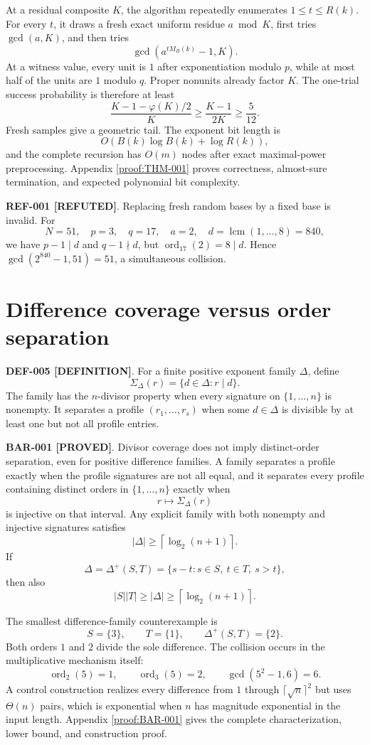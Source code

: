 \documentclass[11pt]{article}
\newcommand{\claimstatus}[2]{\textbf{#1 [#2]}}
\begin{document}
At a residual composite \(K\), the algorithm repeatedly enumerates
\(1\le t\le R(k)\). For every \(t\), it draws a fresh exact uniform residue
\(a\bmod K\), first tries \(\gcd(a,K)\), and then tries
\[
\gcd\!\left(a^{tM_B(k)}-1,K\right).
\]
At a witness value, every unit is \(1\) after exponentiation modulo \(p\), while
at most half of the units are \(1\) modulo \(q\). Proper nonunits already
factor \(K\). The one-trial success probability is therefore at least
\[
\frac{K-1-\varphi(K)/2}{K}
\ge\frac{K-1}{2K}
\ge\frac{5}{12}.
\]
Fresh samples give a geometric tail. The exponent bit length is
\[
O(B(k)\log B(k)+\log R(k)),
\]
and the complete recursion has \(O(m)\) nodes after exact maximal-power
preprocessing. Appendix \ref{proof:THM-001} proves correctness, almost-sure
termination, and expected polynomial bit complexity.

\claimstatus{REF-001}{REFUTED}. Replacing fresh random bases by a fixed base is
invalid. For
\[
N=51,\quad p=3,\quad q=17,\quad a=2,\quad
d=\operatorname{lcm}(1,\ldots,8)=840,
\]
we have \(p-1\mid d\) and \(q-1\nmid d\), but
\(\operatorname{ord}_{17}(2)=8\mid d\). Hence
\(\gcd(2^{840}-1,51)=51\), a simultaneous collision.

\section{Difference coverage versus order separation}

\claimstatus{DEF-005}{DEFINITION}. For a finite positive exponent family
\(\Delta\), define
\[
\Sigma_\Delta(r)=\{d\in\Delta:r\mid d\}.
\]
The family has the \(n\)-divisor property when every signature on
\(\{1,\ldots,n\}\) is nonempty. It separates a profile
\((r_1,\ldots,r_s)\) when some \(d\in\Delta\) is divisible by at least one but
not all profile entries.

\claimstatus{BAR-001}{PROVED}. Divisor coverage does not imply distinct-order
separation, even for positive difference families. A family separates a
profile exactly when the profile signatures are not all equal, and it
separates every profile containing distinct orders in
\(\{1,\ldots,n\}\) exactly when
\[
r\longmapsto\Sigma_\Delta(r)
\]
is injective on that interval. Any explicit family with both nonempty and
injective signatures satisfies
\[
|\Delta|\ge\left\lceil\log_2(n+1)\right\rceil.
\]
If
\[
\Delta=\Delta^+(S,T)=
\{s-t:s\in S,\ t\in T,\ s>t\},
\]
then also
\[
|S||T|\ge|\Delta|
\ge\left\lceil\log_2(n+1)\right\rceil.
\]

The smallest difference-family counterexample is
\[
S=\{3\},\qquad T=\{1\},\qquad\Delta^+(S,T)=\{2\}.
\]
Both orders \(1\) and \(2\) divide the sole difference. The collision occurs
in the multiplicative mechanism itself:
\[
\operatorname{ord}_2(5)=1,\qquad
\operatorname{ord}_3(5)=2,\qquad
\gcd(5^2-1,6)=6.
\]
A control construction realizes every difference from \(1\) through
\(\lceil\sqrt n\rceil^2\) but uses \(\Theta(n)\) pairs, which is exponential
when \(n\) has magnitude exponential in the input length. Appendix
\ref{proof:BAR-001} gives the complete characterization, lower bound, and
construction proof.
\end{document}
